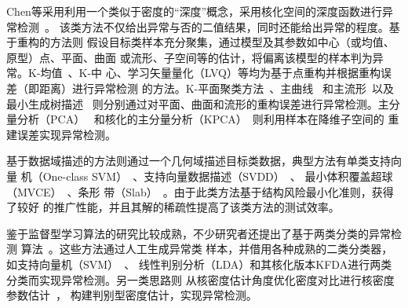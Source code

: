 Chen等采用利用一个类似于密度的“深度”概念，采用核化空间的深度函数进行异常检测~\cite{chen2009outlier}。
该类方法不仅给出异常与否的二值结果，同时还能给出异常的程度。基于重构的方法则
假设目标类样本充分聚集，通过模型及其参数如中心（或均值、原型）点、平面、曲面
或流形、子空间等的估计，将偏离该模型的样本判为异常。K-均值~\cite{taxone}、K-中
心、学习矢量量化（LVQ）等均为基于点重构并根据重构误差（即距离）进行异常检测
的方法。K-平面聚类方法~\cite{bradley2000k}、主曲线~\cite{hastie1989principal}
和主流形~\cite{smola2001regularized}以及最小生成树描述~\cite{juszczak2006learning}
则分别通过对平面、曲面和流形的重构误差进行异常检测。主分量分析（PCA）~\cite{duda2012pattern}
和核化的主分量分析（KPCA）~\cite{hoffmann2007kernel}则利用样本在降维子空间的
重建误差实现异常检测。

基于数据域描述的方法则通过一个几何域描述目标类数据，典型方法有单类支持向量
机（One-class SVM）~\cite{scholkopf2001estimating}、支持向量数据描述（SVDD）~\cite{tax2004support}、
最小体积覆盖超球（MVCE）~\cite{juszczak2006learning, dolia2007kernel}、条形
带（Slab）~\cite{tao2005new}。由于此类方法基于结构风险最小化准则，获得了较好
的推广性能，并且其解的稀疏性提高了该类方法的测试效率。

鉴于监督型学习算法的研究比较成熟，不少研究者还提出了基于两类分类的异常检测
算法~\cite{roth2006kernel, banhalmi2007counter}。这些方法通过人工生成异常类
样本，并借用各种成熟的二类分类器，如支持向量机（SVM）~\cite{bianzhaoqi2000pattern}、
线性判别分析（LDA）和其核化版本KFDA进行两类分类而实现异常检测。另一类思路则
从核密度估计角度优化密度对比进行核密度参数估计~\cite{meinicke2002maximum, meinicke2002discriminative}，
构建判别型密度估计，实现异常检测。
